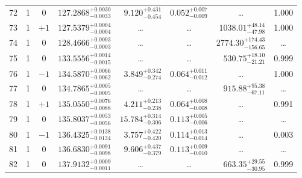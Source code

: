 \begin{table*}[!]
\begin{tabular}{llcrrlrc}
72 & 1 & 0 & $    127.2868_{-      0.0033}^{+      0.0030}$ & $       9.120_{-       0.454}^{+       0.431}$ & $       0.052_{-       0.009}^{+       0.007}$ & \multicolumn{1}{c}{\dots} & 1.000\\[1pt]
73 & 1 & $+1$ & $    127.5379_{-      0.0004}^{+      0.0004}$ & \multicolumn{1}{c}{\dots} & \multicolumn{1}{c}{\dots} & $     1038.01_{-       47.98}^{+       48.14}$ & 1.000\\[1pt]
74 & 1 & 0 & $    128.4666_{-      0.0003}^{+      0.0003}$ & \multicolumn{1}{c}{\dots} & \multicolumn{1}{c}{\dots} & $     2774.30_{-      156.65}^{+      174.43}$ & \dots\\[1pt]


75 & 1 & 0 & $    133.5556_{-      0.0015}^{+      0.0014}$ & \multicolumn{1}{c}{\dots} & \multicolumn{1}{c}{\dots} & $      530.75_{-       21.21}^{+       18.10}$ & 0.999\\[1pt]
76 & 1 & $-1$ & $    134.5870_{-      0.0062}^{+      0.0066}$ & $       3.849_{-       0.274}^{+       0.342}$ & $       0.064_{-       0.012}^{+       0.011}$ & \multicolumn{1}{c}{\dots} & 1.000\\[1pt]
77 & 1 & 0 & $    134.7865_{-      0.0005}^{+      0.0005}$ & \multicolumn{1}{c}{\dots} & \multicolumn{1}{c}{\dots} & $      915.88_{-       67.11}^{+       95.38}$ & \dots\\[1pt]
78 & 1 & $+1$ & $    135.0550_{-      0.0088}^{+      0.0076}$ & $       4.211_{-       0.238}^{+       0.213}$ & $       0.064_{-       0.008}^{+       0.008}$ & \multicolumn{1}{c}{\dots} & 0.991\\[1pt]
79 & 1 & 0 & $    135.8037_{-      0.0056}^{+      0.0053}$ & $      15.784_{-       0.306}^{+       0.314}$ & $       0.113_{-       0.006}^{+       0.005}$ & \multicolumn{1}{c}{\dots} & \dots\\[1pt]
80 & 1 & $-1$ & $    136.4325_{-      0.0134}^{+      0.0138}$ & $       3.757_{-       0.420}^{+       0.422}$ & $       0.114_{-       0.014}^{+       0.013}$ & \multicolumn{1}{c}{\dots} & 0.003\\[1pt]
81 & 1 & 0 & $    136.6830_{-      0.0098}^{+      0.0091}$ & $       9.606_{-       0.379}^{+       0.437}$ & $       0.113_{-       0.010}^{+       0.009}$ & \multicolumn{1}{c}{\dots} & \dots\\[1pt]
82 & 1 & 0 & $    137.9132_{-      0.0011}^{+      0.0009}$ & \multicolumn{1}{c}{\dots} & \multicolumn{1}{c}{\dots} & $      663.35_{-       30.95}^{+       29.55}$ & 0.999\\[1pt]


\end{tabular}
\end{table*}
